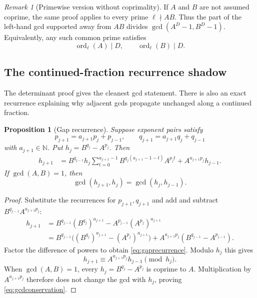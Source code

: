 \documentclass[11pt,oneside]{article}
\newtheorem{proposition}[theorem]{Proposition}
\theoremstyle{definition}
\theoremstyle{remark}
\newtheorem{remark}[theorem]{Remark}
\newcommand{\N}{\mathbb N}
\newcommand{\ord}{\operatorname{ord}}
\begin{document}
\begin{remark}[Primewise version without coprimality]
\label{rem:primewise}
If $A$ and $B$ are not assumed coprime, the same proof applies to every prime
$\ell\nmid AB$.  Thus the part of the left-hand gcd supported away from
$AB$ divides $\gcd(A^D-1,B^D-1)$.  Equivalently, any such common prime
satisfies
\[
  \ord_\ell(A)\mid D,\qquad \ord_\ell(B)\mid D.
\]
\end{remark}

\subsection{The continued-fraction recurrence shadow}

The determinant proof gives the cleanest gcd statement.  There is also an
exact recurrence explaining why adjacent gcds propagate unchanged along a
continued fraction.

\begin{proposition}[Gap recurrence]
\label{prop:gaprecurrence}
Suppose exponent pairs satisfy
\[
 p_{j+1}=a_{j+1}p_j+p_{j-1},\qquad
 q_{j+1}=a_{j+1}q_j+q_{j-1}
\]
with $a_{j+1}\in\N$.  Put $h_j=B^{q_j}-A^{p_j}$.  Then
\begin{align}
 h_{j+1}
 &=B^{q_{j-1}}h_j
   \sum_{t=0}^{a_{j+1}-1}
   B^{q_j(a_{j+1}-1-t)}A^{p_jt}
   +A^{a_{j+1}p_j}h_{j-1}.
 \label{eq:gaprecurrence}
\end{align}
If $\gcd(A,B)=1$, then
\begin{equation}
 \gcd(h_{j+1},h_j)=\gcd(h_j,h_{j-1}).
 \label{eq:gcdconservation}
\end{equation}
\end{proposition}

\begin{proof}
Substitute the recurrences for $p_{j+1},q_{j+1}$ and add and subtract
$B^{q_{j-1}}A^{a_{j+1}p_j}$:
\begin{align*}
 h_{j+1}
 &=B^{q_{j-1}}(B^{q_j})^{a_{j+1}}
   -A^{p_{j-1}}(A^{p_j})^{a_{j+1}}\\
 &=B^{q_{j-1}}
   \bigl((B^{q_j})^{a_{j+1}}-(A^{p_j})^{a_{j+1}}\bigr)
   +A^{a_{j+1}p_j}(B^{q_{j-1}}-A^{p_{j-1}}).
\end{align*}
Factor the difference of powers to obtain \eqref{eq:gaprecurrence}.  Modulo
$h_j$ this gives
\[
 h_{j+1}\equiv A^{a_{j+1}p_j}h_{j-1}\pmod{h_j}.
\]
When $\gcd(A,B)=1$, every $h_j=B^{q_j}-A^{p_j}$ is coprime to $A$.
Multiplication by $A^{a_{j+1}p_j}$ therefore does not change the gcd with
$h_j$, proving \eqref{eq:gcdconservation}.
\end{proof}
\end{document}
